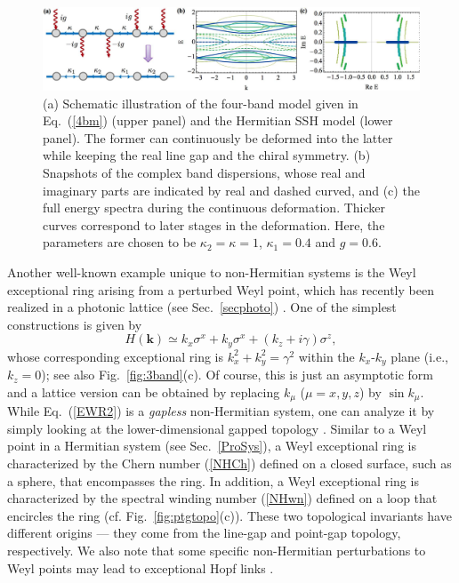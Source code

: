 \documentclass{tADP2e}
\theoremstyle{plain}
\theoremstyle{plain}
\theoremstyle{definition}
\begin{document}
\begin{figure}[!t]
\begin{center}
\includegraphics[width=14.5cm]{./Figures/fig_5_Htopo.pdf}
\end{center}
\caption{(a) Schematic illustration of the four-band model given in Eq.~(\ref{4bm}) (upper panel) and the Hermitian SSH model (lower panel). The former can continuously be deformed into the latter while keeping the real line gap and the chiral symmetry. (b) Snapshots of the complex band dispersions, whose real and imaginary parts are indicated by real and dashed curved, and (c) the full energy spectra during the continuous deformation. Thicker curves correspond to later stages in the deformation. Here, the parameters are chosen to be $\kappa_2=\kappa=1$, $\kappa_1=0.4$ and $g=0.6$.}
\label{fig:Htopo}
\end{figure}

Another well-known example unique to non-Hermitian systems is the Weyl exceptional ring arising from a perturbed Weyl point, which has recently been realized in a photonic lattice (see Sec.~\ref{secphoto}) \cite{AC19}. One of the simplest constructions is given by \cite{XY17}  
\begin{equation}
H(\boldsymbol{k})\simeq k_x\sigma^x+k_y\sigma^x+(k_z+i\gamma)\sigma^z,
\label{EWR2}
\end{equation}
whose corresponding exceptional ring is %
$k_x^2+k_y^2=\gamma^2$ within the $k_x$-$k_y$ plane (i.e., $k_z=0$);  see also Fig.~\ref{fig:3band}(c). Of course, this is just an asymptotic form and a lattice version can be obtained by replacing $k_\mu$ ($\mu=x,y,z$) by $\sin k_\mu$. 
While Eq.~(\ref{EWR2})  is a \emph{gapless} non-Hermitian system, one can analyze it by simply looking at the lower-dimensional gapped topology  \cite{SM13}. Similar to a Weyl point in a Hermitian system (see Sec.~\ref{ProSys}), a Weyl exceptional ring is characterized by the Chern number (\ref{NHCh}) defined on a closed surface, such as a sphere, that encompasses the ring. In addition, a Weyl exceptional ring is characterized by the spectral winding number (\ref{NHwn}) defined on a loop that encircles the ring (cf. Fig.~\ref{fig:ptgtopo}(c)). These two topological invariants have different origins ---  they come from the line-gap and point-gap topology, respectively. We also note that some specific non-Hermitian perturbations to Weyl points may lead to exceptional Hopf links \cite{YZ19,CJ19}.
\end{document}
